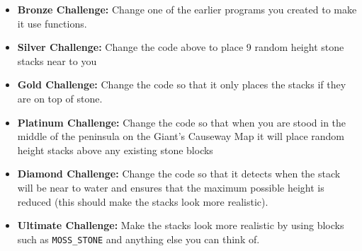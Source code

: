 \documentclass{geocraft-worksheet-multipage}
\begin{document}
\begin{itemize}
\item\textbf{Bronze Challenge:} Change one of the earlier programs you
  created to make it use functions.

\item\textbf{Silver Challenge:} Change the code above to place 9
  random height stone stacks near to you

\item\textbf{Gold Challenge:} Change the code so that it only places
  the stacks if they are on top of stone.

\item\textbf{Platinum Challenge:} Change the code so that when you are
  stood in the middle of the peninsula on the Giant's Causeway Map it
  will place random height stacks above any existing stone blocks

\item\textbf{Diamond Challenge:} Change the code so that it detects
  when the stack will be near to water and ensures that the maximum
  possible height is reduced (this should make the stacks look more
  realistic).

\item\textbf{Ultimate Challenge:} Make the stacks look more realistic
  by using blocks such as \lstinline{MOSS_STONE} and anything else you can think of.

\end{itemize}
\end{document}

